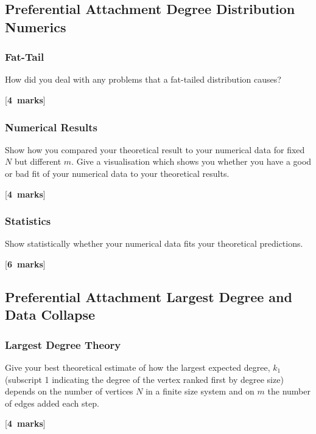 \documentclass[a4paper,12pt]{article}
\newcounter{nmarks}
\newcommand{\qmarks}[1]{\addtocounter{nmarks}{#1} }
\renewcommand{\qmarks}[1]{\addtocounter{nmarks}{#1} \hspace*{\fill} [\textbf{#1~marks}]}
\begin{document}
\subsection{Preferential Attachment Degree Distribution Numerics}

\subsubsection{Fat-Tail}
How did you deal with any problems that a fat-tailed distribution causes? \qmarks{4}

\subsubsection{Numerical Results}
Show how you compared your theoretical result to your numerical data for fixed $N$ but different $m$.
Give a visualisation which shows you whether you have a good or bad fit of your numerical data to your theoretical results.
\qmarks{4}

\subsubsection{Statistics}
Show statistically whether your numerical data fits your theoretical predictions. \qmarks{6}


\subsection{Preferential Attachment Largest Degree and Data Collapse}


\subsubsection{Largest Degree Theory}
Give your best theoretical estimate of how the largest expected degree, $k_\mathrm{1}$ (subscript 1 indicating the degree of the vertex ranked first by degree size) depends on the number of vertices $N$ in a finite size system and on $m$ the number of edges added each step. \qmarks{4}
\end{document}
